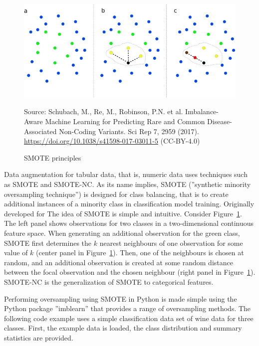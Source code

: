 \begin{figure}
\centering
\includegraphics[width=\textwidth]{smote.png} 

\tiny Source: Schubach, M., Re, M., Robinson, P.N. et al. Imbalance-Aware Machine Learning for Predicting Rare and Common Disease-Associated Non-Coding Variants. Sci Rep 7, 2959 (2017). \url{https://doi.org/10.1038/s41598-017-03011-5} (CC-BY-4.0)
\normalsize
\caption{SMOTE principles}
\label{fig:smote}
\end{figure}

Data augmentation for tabular data, that is, numeric data uses techniques such as SMOTE and SMOTE-NC. As its name implies, SMOTE (''synthetic minority oversampling technique'') is designed for class balancing, that is to create additional instances of a minority class in classification model training. Originally developed for The idea of SMOTE is simple and intuitive. Consider Figure~\ref{fig:smote}. The left panel shows observations for two classes in a two-dimensional continuous feature space. When generating an additional observation for the green class, SMOTE first determines the $k$ nearest neighbours of one observation for some value of $k$ (center panel in Figure~\ref{fig:smote}). Then, one of the neighbours is chosen at random, and an additional observation is created at some random distance between the focal observation and the chosen neighbour (right panel in Figure~\ref{fig:smote}). SMOTE-NC is the generalization of SMOTE to categorical features.

Performing oversampling using SMOTE in Python is made simple using the Python package ''imblearn'' that provides a range of oversampling methods. The following code example uses a simple classification data set of wine data for three classes. First, the example data is loaded, the class distribution and summary statistics are provided.

